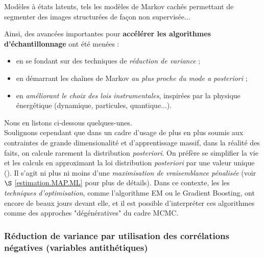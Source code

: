 \begin{exo}
Modèles à états latents, tels les modèles de Markov cachés permettant de segmenter des images structurées de fa\c con non supervisée... \\
\end{exo}

Ainsi, des avancées importantes pour {\bf accélérer les algorithmes d'échantillonnage} ont été menées :
\begin{itemize}
\item en se fondant sur des techniques de \emph{réduction de variance} ; 
\item en démarrant les chaînes de Markov \emph{au plus proche du mode {\it a posteriori}}  ; 
\item en \emph{améliorant le choix des lois instrumentales}, inspirées par la physique énergétique (dynamique, particules, quantique...).
\end{itemize}
Nous en listons ci-dessous quelques-unes. \\

\noindent Soulignons cependant que dans un cadre d'usage de plus en plus soumis aux contraintes de grande dimensionalité et d'apprentissage massif, dans la réalité des faits, on calcule rarement la distribution {\it posteriori}. On préfère se simplifier la vie et les calculs en approximant la loi distribution {\it posteriori} par une valeur unique (). Il s'agit ni plus ni moins d'une \emph{maximisation de vraisemblance pénalisée} (voir $\S$ \ref{estimation.MAP.ML} pour plus de détails). Dans ce contexte, les les \emph{techniques d'optimisation}, comme l'algorithme EM ou le Gradient Boosting,  ont encore de beaux jours devant elle, et il est possible d'interpréter ces algorithmes comme des approches "dégénératives" du cadre MCMC.   


\subsubsection{Réduction de variance par utilisation des corrélations négatives (variables antithétiques)}

